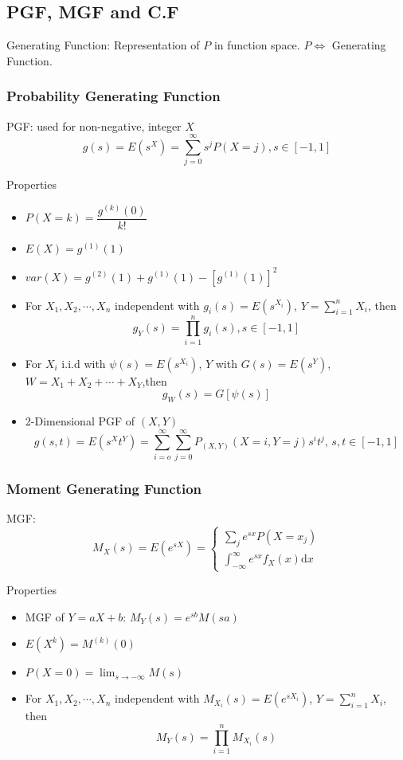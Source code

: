 \documentclass[11pt,a4paper]{ctexart}
\numberwithin{equation}{section}%
\begin{document}
\subsection{PGF, MGF and C.F}\label{SectionPGFMGFCF}

    Generating Function: Representation of $P$ in function space. $P\Leftrightarrow$ Generating Function.

\subsubsection{Probability Generating Function}
    PGF: used for non-negative, integer $X$
    \[
        g(s)=E(s^X)=\sum_{j=0}^\infty s^jP(X=j)    ,s\in[-1,1]
    \]

    Properties
    \begin{itemize}
        \item $P(X=k)=\dfrac{g^{(k)}(0)}{k!}$
        \item $E(X)=g^{(1)}(1)$
        \item $var(X)=g^{(2)}(1)+g^{(1)}(1)-[g^{(1)}(1)]^2 $
        \item For $X_1,X_2,\cdots,X_n$ independent with $g_i(s)=E(s^{X_i})$, $Y={\displaystyle \sum_{i=1}^n} X_i$, then
        \[
            g_Y(s)=\prod_{i=1}^n g_i(s),s\in[-1,1]
        \]
        \item For ${X_i}$ i.i.d with $\psi(s)=E(s^{X_i})$, $Y$ with $G(s)=E(s^{Y})$, $W=X_1+X_2+\cdots +X_Y$,then
        \[
            g_W(s)=G[\psi(s)]    
        \]
        \item 2-Dimensional PGF of $(X,Y)$
        \[
            g(s,t)=E(s^Xt^Y)=\sum_{i=o}^\infty\sum_{j=0}^\infty P_{(X,Y)}(X=i,Y=j)s^it^j,\, s,t\in[-1,1]
        \]
    \end{itemize}
\subsubsection{Moment Generating Function}
    MGF: 
    \[
        M_X(s)=E(e^{sX})=\begin{cases}
            \sum_je^{sx}P(X=x_j)\\
            \int_{-\infty}^\infty e^{sx}f_X(x)\mathrm{d}x
        \end{cases}
    \]

    Properties
    \begin{itemize}
        \item MGF of $Y=aX+b$: $
            M_Y(s)=e^{sb}M(sa)    $
        \item $E(X^k)=M^{(k)}(0)$
        \item $P(X=0)={\displaystyle\lim_{s\to -\infty}}M(s)$
        \item For $X_1,X_2,\cdots,X_n$ independent with $M_{X_i}(s)=E(e^{sX_i})$, $Y={\displaystyle \sum_{i=1}^n} X_i$, then
        \[
            M_Y(s)=\prod_{i=1}^n M_{X_i}(s)
        \]
    \end{itemize}
\end{document}
